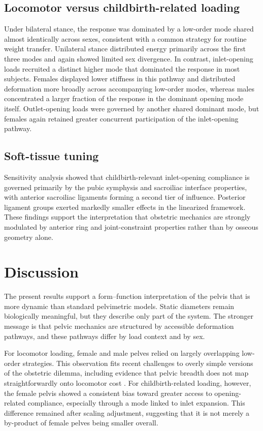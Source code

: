 \documentclass[fleqn,usenatbib]{rsproca_new}
\begin{document}
\subsection{Locomotor versus childbirth-related loading}
Under bilateral stance, the response was dominated by a low-order mode shared almost identically across sexes, consistent with a common strategy for routine weight transfer. Unilateral stance distributed energy primarily across the first three modes and again showed limited sex divergence. In contrast, inlet-opening loads recruited a distinct higher mode that dominated the response in most subjects. Females displayed lower stiffness in this pathway and distributed deformation more broadly across accompanying low-order modes, whereas males concentrated a larger fraction of the response in the dominant opening mode itself. Outlet-opening loads were governed by another shared dominant mode, but females again retained greater concurrent participation of the inlet-opening pathway.

\subsection{Soft-tissue tuning}
Sensitivity analysis showed that childbirth-relevant inlet-opening compliance is governed primarily by the pubic symphysis and sacroiliac interface properties, with anterior sacroiliac ligaments forming a second tier of influence. Posterior ligament groups exerted markedly smaller effects in the linearized framework. These findings support the interpretation that obstetric mechanics are strongly modulated by anterior ring and joint-constraint properties rather than by osseous geometry alone.

\section{Discussion}
The present results support a form--function interpretation of the pelvis that is more dynamic than standard pelvimetric models. Static diameters remain biologically meaningful, but they describe only part of the system. The stronger message is that pelvic mechanics are structured by accessible deformation pathways, and these pathways differ by load context and by sex.

For locomotor loading, female and male pelves relied on largely overlapping low-order strategies. This observation fits recent challenges to overly simple versions of the obstetric dilemma, including evidence that pelvic breadth does not map straightforwardly onto locomotor cost \citep{warrener2015}. For childbirth-related loading, however, the female pelvis showed a consistent bias toward greater access to opening-related compliance, especially through a mode linked to inlet expansion. This difference remained after scaling adjustment, suggesting that it is not merely a by-product of female pelves being smaller overall.
\end{document}
